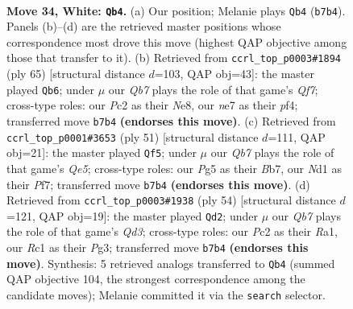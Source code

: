 \documentclass[11pt]{article}
\begin{document}
\clearpage

\begin{figure}[p]\centering
\begin{subfigure}{0.46\textwidth}\centering
\resizebox{\linewidth}{!}{%
\newchessgame
\chessboard[
  setfen={1n1qkb1r/1Q2n3/r1p3p1/3p2P1/p2P1PBp/1P5P/1BP4R/2RN1K2 w - - 0 34},
  showmover=false,
  pgfstyle=straightmove, color=movearrow, markmove={b7-b4}
]}
\caption{}
\end{subfigure}\hfill
\begin{subfigure}{0.46\textwidth}\centering
\resizebox{\linewidth}{!}{%
\newchessgame
\chessboard[
  setfen={r3nbk1/1p3p2/2p3pp/4P3/p4P2/PbNQ2PP/1P1RNqBK/8 b - - 6 33},
  showmover=false,
  pgfstyle=straightmove, color=movearrow, markmove={f2-b6}
]}
\caption{}
\end{subfigure}
\\[4pt]
\begin{subfigure}{0.46\textwidth}\centering
\resizebox{\linewidth}{!}{%
\newchessgame
\chessboard[
  setfen={2r3k1/1bp2p1p/p2p2p1/n2P4/Pp2q2P/1P3N2/3R1PP1/3Q1BK1 b - - 1 26},
  showmover=false,
  pgfstyle=straightmove, color=movearrow, markmove={e4-f5}
]}
\caption{}
\end{subfigure}\hfill
\begin{subfigure}{0.46\textwidth}\centering
\resizebox{\linewidth}{!}{%
\newchessgame
\chessboard[
  setfen={r4qk1/p1rpnp1p/3NpBp1/3nP2P/8/P2Q1PP1/1P6/R3K2R w KQ - 3 28},
  showmover=false,
  pgfstyle=straightmove, color=movearrow, markmove={d3-d2}
]}
\caption{}
\end{subfigure}
\caption{\textbf{Move 34, White: \texttt{Qb4}.} (a) Our position; Melanie plays \texttt{Qb4} (\texttt{b7b4}). Panels (b)--(d) are the retrieved master positions whose correspondence most drove this move (highest QAP objective among those that transfer to it). (b) Retrieved from \texttt{ccrl\_top\_p0003\#1894} (ply 65) [structural distance $d$=103, QAP obj=43]: the master played \texttt{Qb6}; under $\mu$ our \emph{Qb7} plays the role of that game's \emph{Qf7}; cross-type roles: our \emph{P}c2 as their \emph{N}e8, our \emph{n}e7 as their \emph{p}f4; transferred move \texttt{b7b4} \textbf{(endorses this move)}. (c) Retrieved from \texttt{ccrl\_top\_p0001\#3653} (ply 51) [structural distance $d$=111, QAP obj=21]: the master played \texttt{Qf5}; under $\mu$ our \emph{Qb7} plays the role of that game's \emph{Qe5}; cross-type roles: our \emph{P}g5 as their \emph{B}b7, our \emph{N}d1 as their \emph{P}f7; transferred move \texttt{b7b4} \textbf{(endorses this move)}. (d) Retrieved from \texttt{ccrl\_top\_p0003\#1938} (ply 54) [structural distance $d$=121, QAP obj=19]: the master played \texttt{Qd2}; under $\mu$ our \emph{Qb7} plays the role of that game's \emph{Qd3}; cross-type roles: our \emph{P}c2 as their \emph{R}a1, our \emph{R}c1 as their \emph{P}g3; transferred move \texttt{b7b4} \textbf{(endorses this move)}. Synthesis: 5 retrieved analogs transferred to \texttt{Qb4} (summed QAP objective 104, the strongest correspondence among the candidate moves); Melanie committed it via the \texttt{search} selector.}
\label{fig:thought-m66}
\end{figure}
\end{document}
